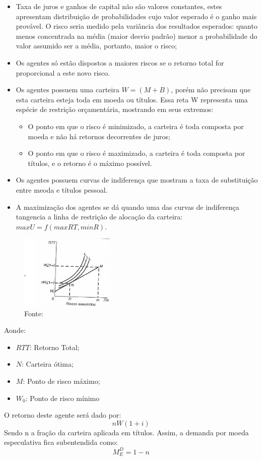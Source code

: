 \documentclass[12pt,a4paper,oneside,brazil]{abntex2}
\begin{document}
\begin{itemize}
\item Taxa de juros e ganhos de capital não são valores constantes, estes apresentam distribuição de probabilidades cujo valor esperado é o ganho mais provável. O risco seria medido pela variância dos resultados esperados: quanto menos concentrada na média (maior desvio padrão) menor a probabilidade do valor assumido ser a média, portanto, maior o risco;
\item Os agentes só estão dispostos a maiores riscos se o retorno total for proporcional a este novo risco.
\item Os agentes possuem uma carteira $W = ( M + B)$, porém não precisam que esta carteira esteja toda em moeda ou títulos. Essa reta W representa uma espécie de restrição orçamentária, mostrando em seus extremos:
\begin{itemize}
\item O ponto em que o risco é minimizado, a carteira é toda composta por moeda e não há retornos decorrentes de juros;
\item O ponto em que o risco é maximizado, a carteira é toda composta por títulos, e o retorno é o máximo possível.
\end{itemize}
\item Os agentes possuem curvas de indiferença que mostram a taxa de substituição entre meoda e títulos pessoal.
\item A maximização dos agentes se dá quando uma das curvas de indiferença tangencia a linha de restrição de alocação da carteira: $max U = f( max RT, min R)$.
\end{itemize}

\begin{figure}
	\includegraphics[width=0.4\textwidth]{Contribuicao de Tobin.png}
	\centering
	\caption{Fonte: \cite[p. 82]{rossetti98}}
	
\end{figure}
Aonde:
\begin{itemize}
\item $RTT$: Retorno Total;
\item $N$: Carteira ótima;
\item $M$: Ponto de risco máximo;
\item $W_0$: Ponto de risco mínimo
\end{itemize}
\clearpage
O retorno deste agente será dado por: 
\[ n W ( 1 + i) \]
Sendo n a fração da carteira aplicada em títulos. Assim, a demanda por moeda especulativa fica subentendida como:
\[ M^{D}_{E} = 1- n \]
\end{document}
